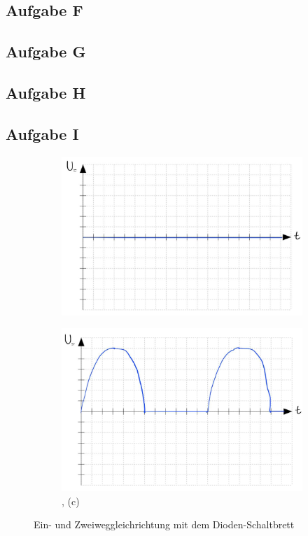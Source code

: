 \subsection*{Aufgabe F}
\subsection*{Aufgabe G}
\subsection*{Aufgabe H}
\subsection*{Aufgabe I}
\begin{figure}[H]
    \begin{subfigure}[b]{0.45\textwidth}
        \includegraphics[width=\textwidth]{Voraufgaben/Ia.jpg}
        \caption{}
        \label{fig:VA_I_a}
    \end{subfigure}
    \hfill
    \begin{subfigure}[b]{0.45\textwidth}
        \includegraphics[width=\textwidth]{Voraufgaben/Ib,c.jpg}
        \caption{, (c)}
        \label{fig:VA_I_d}
    \end{subfigure}
    \caption{Ein- und Zweiweggleichrichtung mit dem Dioden-Schaltbrett}
\end{figure}

